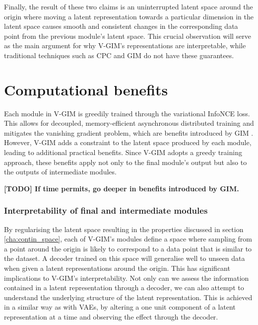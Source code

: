			Finally, the result of these two claims is an uninterrupted latent space around the origin 
			where moving a latent representation towards a particular dimension in the latent space causes smooth and consistent changes in the corresponding data point from the previous module's latent space. This crucial observation will serve as the main argument for why V-GIM's representations are interpretable, while traditional techniques such as CPC and GIM do not have these guarantees. 
		
		
			


		
\section{Computational benefits} \label{cha:vgim_benefits}
	Each module in V-GIM is greedily trained through the variational InfoNCE loss. This allows for decoupled, memory-efficient asynchronous distributed training and mitigates the vanishing gradient problem, which are benefits introduced by GIM \cite{lowePuttingEndEndtoEnd2020}. However, V-GIM adds a constraint to the latent space produced by each module, leading to additional practical benefits. Since V-GIM adopts a greedy training approach, these benefits apply not only to the final module's output but also to the outputs of intermediate modules.
	
	\textbf{[TODO] If time permits, go deeper in benefits introduced by GIM.}
	

	\subsubsection{Interpretability of final and intermediate modules}
		By regularising the latent space resulting in the properties discussed in section \ref{cha:contin_space}, each of V-GIM's modules define a space where sampling from a point around the origin is likely to correspond to a data point that is similar to the dataset. A decoder trained on this space will generalise well to unseen data when given a latent representations around the origin. 
		This has significant implications to V-GIM's interpretability. Not only can we assess the information contained in a latent representation through a decoder, we can also attempt to understand the underlying structure of the latent representation. This is achieved in a similar way as with VAEs, by altering a one unit component of a latent representation at a time and observing the effect through the decoder.	
		
